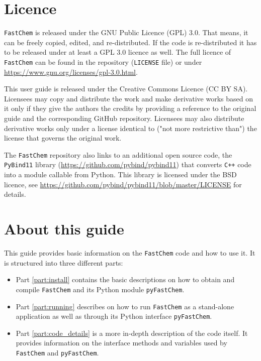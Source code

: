 \documentclass[numbers=noenddot]{aux/fcmanual}
\newcommand{\fc}{\texttt{FastChem}\xspace}
\newcommand{\pfc}{\texttt{pyFastChem}\xspace}
\newcommand{\cpp}{\ttt{C++}\xspace}
\newcommand{\pb}{\texttt{PyBind11}\xspace}
\newcommand{\ttt}[1]{\texttt {#1}}
\begin{document}
\section{Licence}

\fc is released under the GNU Public Licence (GPL) 3.0. That means, it can be freely copied, edited, and re-distributed. If the code is re-distributed it has to be released under at least a GPL 3.0 licence as well. The full licence of \fc can be found in the repository (\ttt{LICENSE} file) or under \url{https://www.gnu.org/licenses/gpl-3.0.html}.

This user guide is released under the Creative Commons Licence (CC BY SA). Licensees may copy and distribute the work and make derivative works based on it only if they give the authors the credits by providing a reference to the original guide and the corresponding GitHub repository. Licensees may also distribute derivative works only under a license identical to ("not more restrictive than") the license that governs the original work.

The \fc repository also links to an additional open source code, the \pb library (\url{https://github.com/pybind/pybind11}) that converts \cpp code into a module callable from Python.
This library is licensed under the BSD licence, see \url{https://github.com/pybind/pybind11/blob/master/LICENSE} for details.

\newpage

\section{About this guide}

This guide provides basic information on the \fc code and how to use it. It is structured into three different parts:

\begin{itemize}
  \item Part \ref{part:install} contains the basic descriptions on how to obtain and compile \fc and its Python module \pfc.

  \item Part \ref{part:running} describes on how to run \fc as a stand-alone application as well as through its Python interface \pfc.

  \item Part \ref{part:code_details} is a more in-depth description of the code itself. It provides information on the interface methods and variables used by \fc and \pfc.
\end{itemize}
\end{document}
